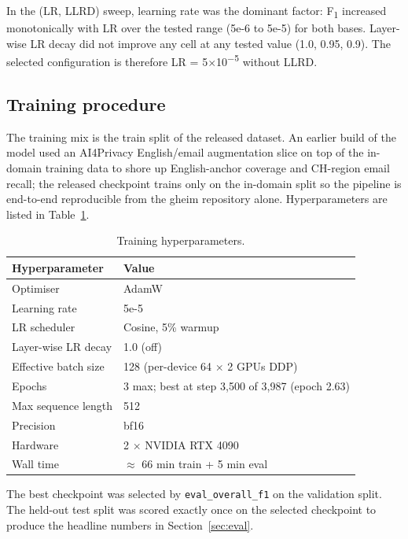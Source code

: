 \documentclass[sigconf,nonacm]{acmart}
\begin{document}
In the (LR, LLRD) sweep, learning rate was the dominant factor:
F\textsubscript{1} increased monotonically with LR over the tested
range (5e-6 to 5e-5) for both bases. Layer-wise LR decay did not
improve any cell at any tested value (1.0, 0.95, 0.9). The selected
configuration is therefore LR = 5$\times$10\textsuperscript{$-$5}
without LLRD.

\subsection{Training procedure}

The training mix is the train split of the released dataset. An
earlier build of the model used an AI4Privacy English/email
augmentation slice on top of the in-domain training data to shore
up English-anchor coverage and CH-region email recall; the
released checkpoint trains only on the in-domain split so the
pipeline is end-to-end reproducible from the gheim repository
alone. Hyperparameters are listed in Table~\ref{tab:hyperparams}.

\begin{table}[h]
\centering
\caption{Training hyperparameters.}
\label{tab:hyperparams}
\small
\begin{tabular}{l l}
\toprule
Hyperparameter        & Value \\
\midrule
Optimiser             & AdamW~\cite{loshchilov2019decoupled} \\
Learning rate         & 5e-5 \\
LR scheduler          & Cosine, 5\% warmup \\
Layer-wise LR decay   & 1.0 (off) \\
Effective batch size  & 128 (per-device 64 $\times$ 2 GPUs DDP) \\
Epochs                & 3 max; best at step 3{,}500 of 3{,}987 (epoch 2.63) \\
Max sequence length   & 512 \\
Precision             & bf16 \\
Hardware              & 2 $\times$ NVIDIA RTX 4090 \\
Wall time             & ${\approx}$ 66 min train + 5 min eval \\
\bottomrule
\end{tabular}
\end{table}

The best checkpoint was selected by \texttt{eval\_overall\_f1} on the
validation split. The held-out test split was scored exactly once on
the selected checkpoint to produce the headline numbers in
Section~\ref{sec:eval}.
\end{document}
